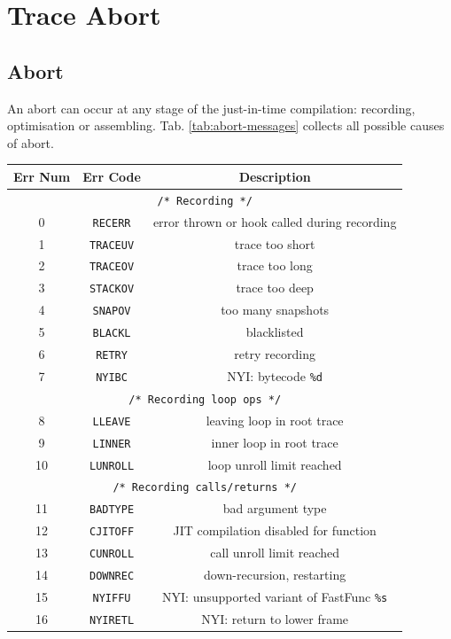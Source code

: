 \section{Trace Abort}
\subsection{Abort}
An abort can occur at any stage of the just-in-time compilation: recording, optimisation or assembling.  Tab. \ref{tab:abort-messages} collects all possible causes of abort.

\begin{center}
\begin{longtable}{|c|c|c|}
\hline
\textbf{Err Num} & \textbf{Err Code} & \textbf{Description}\\
\hline
\multicolumn{3}{|c|}{\texttt{/* Recording */}}  \\
\hline
0 & \texttt{RECERR} &	error thrown or hook called during recording\\
1 & \texttt{TRACEUV} &	trace too short\\
2 & \texttt{TRACEOV} &	trace too long\\
3 & \texttt{STACKOV} &	trace too deep\\
4 & \texttt{SNAPOV} &	too many snapshots\\
5 & \texttt{BLACKL} &	blacklisted\\
6 & \texttt{RETRY} &   retry recording\\
7 & \texttt{NYIBC} &   NYI: bytecode \texttt{\%d}\\
\hline
\multicolumn{3}{|c|}{\texttt{/* Recording loop ops */}}  \\
\hline
8 & \texttt{LLEAVE} & leaving loop in root trace\\
9 & \texttt{LINNER} &	inner loop in root trace\\
10 & \texttt{LUNROLL} &	loop unroll limit reached\\
\hline
\multicolumn{3}{|c|}{\texttt{/* Recording calls/returns */}}   \\
\hline
11 & \texttt{BADTYPE} &	bad argument type\\
12 & \texttt{CJITOFF} &	JIT compilation disabled for function\\
13 & \texttt{CUNROLL} &	call unroll limit reached\\
14 & \texttt{DOWNREC} &	down-recursion, restarting\\
15 & \texttt{NYIFFU} &	NYI: unsupported variant of FastFunc \texttt{\%s}\\
16 & \texttt{NYIRETL} &	NYI: return to lower frame\\

\end{longtable}
\end{center}
